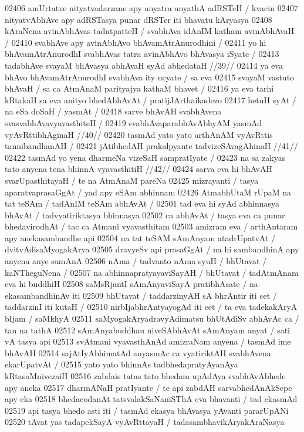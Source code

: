 02406 amUrtatve nityatvadarzane apy anyatra anyathA adRSTeH / kvacin
02407 nityatvAbhAve apy adRSTasya punar dRSTer iti bhavatu kAryasya
02408 kAraNena avinAbhAvas tadutpatteH / svabhAva idAnIM katham avinAbhAvaH /
02410 	svabhAve apy avinAbhAvo bhAvamAtrAnurodhini / 
02411 yo hi bhAvamAtrAnurodhI svabhAvas tatra avinAbhAvo bhAvasya iSyate /
02413 	tadabhAve svayaM bhAvasya abhAvaH syAd abhedataH //39//
02414 ya eva bhAvo bhAvamAtrAnurodhI svabhAva ity ucyate / sa eva 
02415 svayaM vastuto bhAvaH / sa ca AtmAnaM parityajya kathaM bhavet / 
02416 ya eva tarhi kRtakaH sa eva anityo bhedAbhAvAt / pratijJArthaikadezo 
02417 hetuH syAt / na eSa doSaH / yasmAt /
02418 	sarve bhAvAH svabhAvena svasvabhAvavyavasthiteH /  
02419 	svabhAvaparabhAvAbhyAM yasmAd vyAvRttibhAginaH //40// 
02420 	tasmAd yato yato arthAnAM vyAvRttis tannibandhanAH /  
02421 	jAtibhedAH prakalpyante tadvizeSAvagAhinaH //41// 
02422 	tasmAd yo yena dharmeNa vizeSaH sampratIyate /
02423 	na sa zakyas tato anyena tena bhinnA vyavasthitiH //42//
02424 sarva eva hi bhAvAH svarUpasthitayaH / te na AtmAnaM pareNa
02425 mizrayanti / tasya aparatvaprasaGgAt / yad apy eSAm abhinnam  
02426 AtmabhUtaM rUpaM na tat teSAm / tadAnIM teSAm abhAvAt / 
02501 tad eva hi syAd abhinnasya bhAvAt / tadvyatiriktasya bhinnasya  
02502 ca abhAvAt / tasya eva ca punar bhedavirodhAt / tac ca Atmani vyavasthitam
02503 amizram eva / arthAntaram apy anekasambandhe api  
02504 na tat teSAM sAmAnyam atadrUpatvAt / dvitvAdisaMyogakArya 
02505 dravyeSv api prasaGgAt / na hi sambandhinA apy anyena anye samAnA  
02506 nAma / tadvanto nAma syuH / bhUtavat / kaNTheguNena / 
02507 na abhinnapratyayaviSayAH / bhUtavat / tadAtmAnam eva hi buddhiH
02508 saMsRjantI sAmAnyaviSayA pratibhAsate / na ekasambandhinAv iti 
02509 bhUtavat / taddarzinyAH sA bhrAntir iti cet / taddarzinI iti kutaH /
02510 nirbIjabhrAntyayogAd iti cet / ta eva tadekakAryA bIjam / saMkhyA
02511 saMyogakAryadravyAdimatsu bhUtAdiSv abhAvAc ca / tan na tathA
02512 sAmAnyabuddhau niveSAbhAvAt sAmAnyam anyat / sati vA tasya api  
02513 svAtmani vyavasthAnAd amizraNam anyena / tasmAd ime bhAvAH 
02514 sajAtIyAbhimatAd anyasmAc ca vyatiriktAH svabhAvena  ekarUpatvAt /
02515 yato yato bhinnAs tadbhedapratyAyanAya kRtasaMnivezaiH  
02516 zabdais tatas tato bhedam upAdAya svabhAvAbhede apy aneka  
02517 dharmANaH pratIyante / te api zabdAH sarvabhedAnAkSepe apy eka 
02518 bhedacodanAt tatsvalakSaNaniSThA eva bhavanti / tad ekasmAd
02519 api tasya bhedo asti iti / tasmAd ekasya bhAvasya yAvanti pararUpANi 
02520 tAvat yas tadapekSayA vyAvRttayaH / tadasambhavikAryakAraNasya

